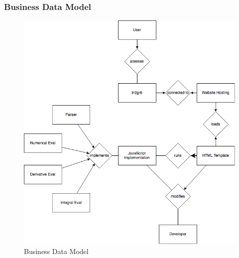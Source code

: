 \documentclass[11pt, oneside]{article}
\begin{document}
\subsubsection{Business Data Model}
\begin{figure}[H] %
   \centering
   \includegraphics[width=6in]{BusinessDataModel.png}
   \caption{Business Data Model}
   \label{fig:example}
\end{figure}
\end{document}
